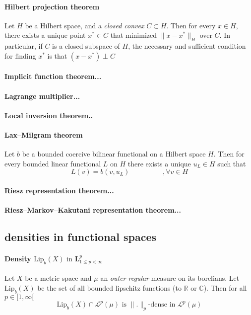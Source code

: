 \documentclass[a4paper,10pt]{article}
\begin{document}
\paragraph{Hilbert projection theorem} Let $H$ be a Hilbert space, and a \textit{closed convex} $C \subset H$. Then for every $x\in H$, there exists a unique point $x^{*}\in C$ that minimized $\|x-x^{*}\|_{H}$ over $C$. In particular, if $C$ is a closed subspace of $H$, the necessary and sufficient condition for finding $x^{*}$ is that $(x-x^{*}) \perp C$


\paragraph{Implicit function theorem...}%
\paragraph{Lagrange multiplier...}%
\paragraph{Local inversion theorem..}%

\paragraph{Lax–Milgram theorem} Let $b$ be a bounded coercive bilinear functional on a Hilbert space $H$. Then for every bounded linear functional $L$ on $H$ there exists a unique $u_{L} \in H$ such that 
\[
L(v) = b(v,u_{L}) \hspace{2cm} ,\forall v \in H
\]

\paragraph{Riesz representation theorem...}%
\paragraph{Riesz–Markov–Kakutani representation theorem...}%
\subsection{densities in functional spaces}
\paragraph{Density $\text{Lip}_b(X) \text{ in } \textbf{L}^p_{1 \leq p < \infty}$} Let $X$ be a metric space and $\mu$ an \textit{outer regular} measure on its borelians. Let $\text{Lip}_b(X)$ be the set of all bounded lipschitz functions (to $\mathbb{R} \text{ or } \mathbb{C} $). Then for all $ p \in [1, \infty[ $
\[
\text{Lip}_b(X) \cap \mathcal{L}^p(\mu) \text{ is } \|.\|_p \text{-dense in }  \mathcal{L}^p(\mu)
\]
\end{document}
